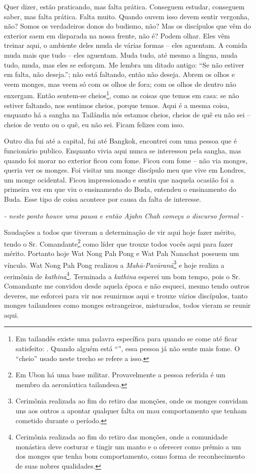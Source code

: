 Quer dizer, estão praticando, mas falta prática. Conseguem estudar,
conseguem saber, mas falta prática. Falta muito. Quando ouvem isso
devem sentir vergonha, não? Somos os verdadeiros donos do budismo, não?
Mas os discípulos que vêm do exterior saem em disparada na nossa
frente, não é? Podem olhar. Eles vêm treinar aqui, o ambiente deles
muda de várias formas – eles aguentam. A comida muda
mais que tudo – eles aguentam. Muda tudo, até mesmo
a língua, muda tudo, muda, mas eles se esforçam. Me lembra um ditado
antigo: “Se não estiver em falta, não deseja.”; não está faltando,
então não deseja. Abrem os olhos e veem monges, mas veem só com os
olhos de fora; com os olhos de dentro não enxergam. Então sentem-se
cheios\footnote{Em tailandês existe uma palavra específica para quando
se come até ficar satisfeito: . Quando alguém
está “”, essa pessoa já não sente mais fome. O
“cheio” usado neste trecho se refere a isso.}, como as coisas que temos
em casa: se não estiver faltando, nos sentimos cheios, porque temos.
Aqui é a mesma coisa, enquanto há a sangha na Tailândia nós estamos
cheios, cheios de quê eu não sei – cheios de vento
ou o quê, eu não sei. Ficam felizes com isso. 

Outro dia fui até a capital, fui até Bangkok, encontrei com uma
pessoa que é funcionário publico. Enquanto vivia aqui nunca se
interessou pela sangha, mas quando foi morar no exterior ficou com
fome. Ficou com fome – não via monges, queria ver os
monges. Foi visitar um monge discípulo meu que vive em Londres, um
monge ocidental. Ficou impressionado e sentiu que naquela ocasião foi a
primeira vez em que viu o ensinamento do Buda, entendeu o ensinamento
do Buda. Esse tipo de coisa acontece por causa da falta de interesse. 

{\itshape
- neste ponto houve uma pausa e então Ajahn Chah começa o discurso
formal -}

Saudações a todos que tiveram a determinação de vir aqui hoje fazer
mérito, tendo o Sr. Comandante\footnote{Em Ubon há uma base militar.
Provavelmente a pessoa referida é um membro da aeronáutica tailandesa.
} como líder que trouxe todos vocês aqui para fazer mérito. Portanto
hoje Wat Nong Pah Pong e Wat Pah Nanachat possuem um vínculo. Wat Nong
Pah Pong realizou a \textit{Mahā-Pavāranā}\footnote{Cerimônia
realizada ao fim do retiro das monções, onde os monges convidam uns aos
outros a apontar qualquer falta ou mau comportamento que tenham
cometido durante o período.} e hoje realiza a cerimônia de
\textit{kathina}\footnote{Cerimônia realizada ao fim do retiro das
monções, onde a comunidade monástica deve costurar e tingir um manto e
o oferecer como prêmio a um dos monges que tenha bom comportamento,
como forma de reconhecimento de suas nobres qualidades.}. Terminada a
\textit{kathina} esperei um bom tempo, pois o Sr. Comandante me
convidou desde aquela época e não esqueci, mesmo tendo outros deveres,
me esforcei para vir nos reunirmos aqui e trouxe vários discípulos,
tanto monges tailandeses como monges estrangeiros, misturados, todos
vieram se reunir aqui. 

